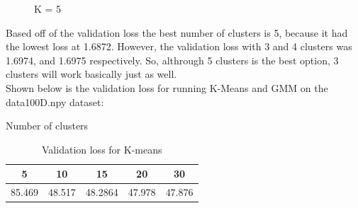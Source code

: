 \documentclass[12pt]{article}
\begin{document}
\begin{figure}[!tbp]
    \centering
    \hfill
    \caption{K = 5}
\end{figure}

\newpage
\newpage
Based off of the validation loss the best number of clusters is 5, because it
had the lowest loss at 1.6872. However, the validation loss with 3 and 4 clusters was 1.6974, and 
1.6975 respectively. So, althrough 5 clusters is the best option, 3 clusters will work basically 
just as well. \\

Shown below is the validation loss for running K-Means and GMM on the data100D.npy
dataset:

\begin{center}
  \begin{table}[h]
    \centering
    Number of clusters \\
    \begin{tabular}{||c c c c c||}
      \hline
      5 & 10 & 15 & 20 & 30 \\
      \hline \hline 
      85.469& 48.517& 48.2864& 47.978& 47.876\\
      \hline
    \end{tabular}
    \caption{Validation loss for K-means}
  \end{table}
\end{center}
\end{document}
